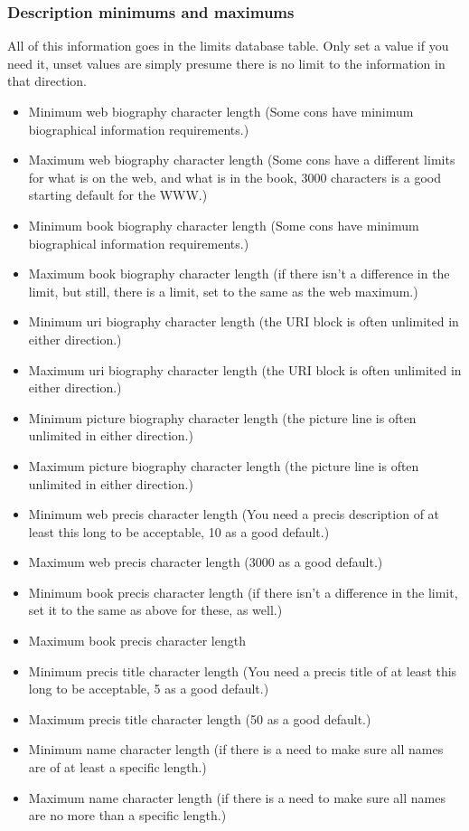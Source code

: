 \documentclass[captions=tablesignature]{scrartcl}
\begin{document}
\subsubsection{Description minimums and maximums}
\label{sec-1-2-5}
All of this information goes in the limits database table.  Only
set a value if you need it, unset values are simply presume there
is no limit to the information in that direction.
\begin{itemize}
\item Minimum web biography character length (Some cons have minimum
biographical information requirements.)
\item Maximum web biography character length (Some cons have a
different limits for what is on the web, and what is in the
book, 3000 characters is a good starting default for the WWW.)
\item Minimum book biography character length (Some cons have minimum
biographical information requirements.)
\item Maximum book biography character length (if there isn't a
difference in the limit, but still, there is a limit, set to
the same as the web maximum.)
\item Minimum uri biography character length (the URI block is often
unlimited in either direction.)
\item Maximum uri biography character length (the URI block is often
unlimited in either direction.)
\item Minimum picture biography character length (the picture line is
often unlimited in either direction.)
\item Maximum picture biography character length (the picture line is
often unlimited in either direction.)
\item Minimum web precis character length (You need a precis
description of at least this long to be acceptable, 10 as a
good default.)
\item Maximum web precis character length (3000 as a good default.)
\item Minimum book precis character length (if there isn't a
difference in the limit, set it to the same as above for these,
as well.)
\item Maximum book precis character length
\item Minimum precis title character length (You need a precis title
of at least this long to be acceptable, 5 as a good default.)
\item Maximum precis title character length (50 as a good default.)
\item Minimum name character length (if there is a need to make sure
all names are of at least a specific length.)
\item Maximum name character length (if there is a need to make sure
all names are no more than a specific length.)
\end{itemize}
\end{document}
